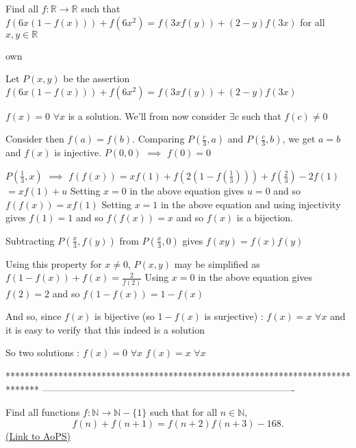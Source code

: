 \begin{solution}
	\begin{tcolorbox}Find all $ f: \mathbb{R}\to\mathbb{R}$ such that
$ f(6x(1 - f(x))) + f(6x^2) = f(3xf(y)) + (2 - y)f(3x)$ for all $ x,y\in\mathbb{R}$


own\end{tcolorbox}

Let $ P(x,y)$ be the assertion $ f(6x(1-f(x)))+f(6x^2)=f(3xf(y))+(2-y)f(3x)$

$ f(x)=0$ $ \forall x$ is a solution. We'll from now consider $ \exists c$ such that $ f(c)\neq 0$

Consider then $ f(a)=f(b)$. Comparing $ P(\frac c3,a)$ and $ P(\frac c3,b)$, we get $ a=b$ and $ f(x)$ is injective.
$ P(0,0)$ $ \implies$ $ f(0)=0$

$ P(\frac 13,x)$ $ \implies$ $ f(f(x))=xf(1)+f(2(1-f(\frac 13)))+f(\frac 23)-2f(1)$ $ =xf(1)+u$
Setting $ x=0$ in the above equation gives $ u=0$ and so $ f(f(x))=xf(1)$
Setting $ x=1$ in the above equation and using injectivity gives $ f(1)=1$ and so $ f(f(x))=x$ and so $ f(x)$ is a bijection.

Subtracting $ P(\frac x3,f(y))$ from $ P(\frac x3,0)$ gives $ f(xy)=f(x)f(y)$

Using this property for $ x\neq 0$, $ P(x,y)$ may be simplified as $ f(1-f(x))+f(x)=\frac 2{f(2)}$ 
Using $ x=0$ in the above equation gives $ f(2)=2$ and so $ f(1-f(x))=1-f(x)$

And so, since $ f(x)$ is bijective (so $ 1-f(x)$ is surjective) : $ f(x)=x$ $ \forall x$ and it is easy to verify that this indeed is a solution

So two solutions :
$ f(x)=0$ $ \forall x$
$ f(x)=x$ $ \forall x$
\end{solution}
*******************************************************************************
-------------------------------------------------------------------------------

\begin{problem}
	Find all functions $ f: \mathbb{N} \rightarrow \mathbb{N} - \{1\}$  such that for all $n \in \mathbb{N}$, \[ f(n) + f(n+1) = f(n+2)f(n+3) - 168.\]
	\flushright \href{https://artofproblemsolving.com/community/c6h303012}{(Link to AoPS)}
\end{problem}



